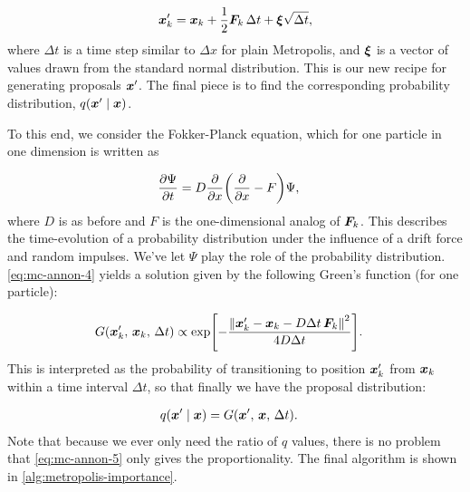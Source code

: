 \documentclass[Thesis.tex]{subfiles}
\begin{document}
\begin{align}
  \bm{x}_k' = \bm{x}_k + \frac{1}{2}\bm{F}_k\,\Delta t + \bm{\xi}\sqrt{\Delta t},
\end{align}
where $\Delta t$ is a time step similar to $\Delta x$ for plain Metropolis, and
$\bm{\xi}$ is a vector of values drawn from the standard normal distribution.
This is our new recipe for generating proposals $\bm{x}'$. The final piece is
to find the corresponding probability distribution,
$q\qty(\bm{x}'\;\middle|\;\bm{x})$.

To this end, we consider the Fokker-Planck equation, which for one particle in
one dimension is written as

\begin{align}
  \label{eq:mc-annon-4}
  \pdv{\Psi}{t} &= D\pdv{}{x}\qty(\pdv{}{x} - F)\Psi,
\end{align}
where $D$ is as before and $F$ is the one-dimensional analog of $\bm{F}_k$. This
describes the time-evolution of a probability distribution under the influence
of a drift force and random impulses. We've let $\Psi$ play the role of the
probability distribution. \cref{eq:mc-annon-4} yields a solution given by the
following Green's function (for one particle):

\begin{align}
  \label{eq:mc-annon-5}
  G\qty(\bm{x}_k', \,\bm{x}_k,\,\Delta t) &\propto \exp[-\frac{\norm{\bm{x}_k' - \bm{x}_k - D\Delta t\,\bm{F}_k}^2}{4D\Delta t}].
\end{align}
This is interpreted as the probability of transitioning to position $\bm{x}_k'$
from $\bm{x}_k$ within a time interval $\Delta t$, so that finally we have the
proposal distribution:

\begin{align}
  q\qty(\bm{x}'\;\middle|\;\bm{x}) &=G\qty(\bm{x}', \,\bm{x},\,\Delta t).
\end{align}
Note that because we ever only need the ratio of $q$ values, there is no problem
that \cref{eq:mc-annon-5} only gives the proportionality. The final algorithm is
shown in \cref{alg:metropolis-importance}.
\end{document}
